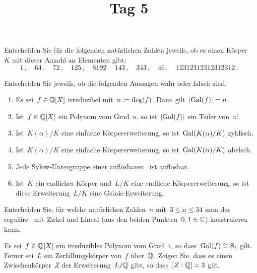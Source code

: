 \documentclass{scrartcl}
\title{\vspace{-1em}Tag 5}
\author{}
\date{}
\begin{document}
\maketitle
\vspace{-7em}

\begin{exercise}[subtitle = {Erstklausur~18/19, Zweitklausur~18/19}]
  Entscheiden Sie für die folgenden natürlichen Zahlen jeweils, ob es einen Körper~$K$ mit dieser Anzahl an Elementen gibt:
  \[
    1 \,,
    \quad
    64 \,,
    \quad
    72 \,,
    \quad
    125 \,,
    \quad
    8192 \,
    \quad
    143 \,,
    \quad
    343 \,,
    \quad
    46 \,,
    \quad
    12312312312312312 \,.
  \]
\end{exercise}

\begin{exercise}[subtitle = {Erstklausur~18/19, Zweitklausur~19/20}]
  Entscheiden Sie jeweils, ob die folgenden Aussagen wahr oder falsch sind.
  \begin{enumerate}
    \item
      Es sei~$f \in \mathbb{Q}[X]$ irreduzibel mit~$n \coloneqq \deg(f)$.
      Dann gilt~$\lvert \operatorname{Gal}(f) \rvert = n$.
    \item
      Ist~$f \in \mathbb{Q}[X]$ ein Polynom vom Grad~$n$, so ist~$\lvert \operatorname{Gal}(f) \rvert$ ein Teiler von~$n!$.
    \item
      Ist~$K(\alpha)/K$ eine einfache Körpererweiterung, so ist~$\operatorname{Gal}( K(\alpha) / K )$ zyklisch.
    \item
      Ist~$K(\alpha)/K$ eine einfache Körpererweiterung, so ist~$\operatorname{Gal}( K(\alpha) / K )$ abelsch.
    \item
      Jede Sylow-Untergruppe einer auflösbaren~ ist auflösbar.
    \item
      Ist~$K$ ein endlicher Körper und~$L/K$ eine endliche Körpererweiterung, so ist diese Erweiterung~$L/K$ eine Galois-Erweiterung.
  \end{enumerate}
\end{exercise}

\begin{exercise}
  Entscheiden Sie, für welche natürlichen Zahlen~$n$ mit~$3 \leq n \leq 34$ man das reguläre~ mit Zirkel und Lineal (aus den beiden Punkten~$0,1 \in \mathbb{C}$) konstruieren kann.
\end{exercise}

\begin{exercise}[subtitle = {Erstklausur~18/19}]
  Es sei~$f \in \mathbb{Q}[X]$ ein irreduzibles Polynom vom Grad~$4$, so dass~$\operatorname{Gal}(f) \cong \operatorname{S}_4$ gilt.
  Ferner sei~$L$ ein Zerfällungskörper von~$f$ über~$\mathbb{Q}$.
  Zeigen Sie, dass es einen Zwischenkörper~$Z$ der Erweiterung~$L / \mathbb{Q}$ gibt, so dass~$[Z : \mathbb{Q}] = 3$ gilt.
\end{exercise}
\end{document}
